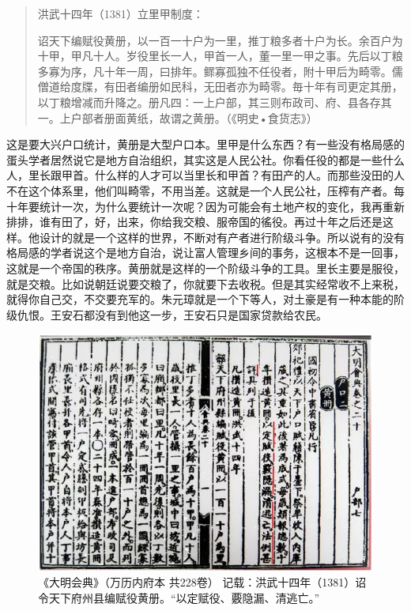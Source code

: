 \begin{quote}
洪武十四年（1381）立里甲制度：

诏天下编赋役黄册，以一百一十户为一里，推丁粮多者十户为长。余百户为十甲，甲凡十人。岁役里长一人，甲首一人，董一里一甲之事。先后以丁粮多寡为序，凡十年一周，曰排年。鳏寡孤独不任役者，附十甲后为畸零。儒僧道给度牒，有田者编册如民科，无田者亦为畸零。毎十年有司更定其册，以丁粮增减而升降之。册凡四：一上户部，其三则布政司、府、县各存其一。上户部者册面黄纸，故谓之黄册。（《明史•食货志》）
\end{quote}

这是要大兴户口统计，黄册是大型户口本。里甲是什么东西？有一些没有格局感的蛋头学者居然说它是地方自治组织，其实这是人民公社。你看任役的都是一些什么人，里长跟甲首。什么样的人才可以当里长和甲首？有田产的人。而那些没田的人不在这个体系里，他们叫畸零，不用当差。这就是一个人民公社，压榨有产者。每十年要统计一次，为什么要统计一次呢？因为可能会有土地产权的变化，我再重新排排，谁有田了，好，出来，你给我交粮、服帝国的徭役。再过十年之后还是这样。他设计的就是一个这样的世界，不断对有产者进行阶级斗争。所以说有的没有格局感的学者说这个是地方自治，说让富人管理乡间的事务，这根本不是一回事，这就是一个帝国的秩序。黄册就是这样的一个阶级斗争的工具。里长主要是服役，就是交粮。比如说朝廷说要交粮了，你就要下去收税。但是其实经常收不上来税，就得你自己交，不交要充军的。朱元璋就是一个下等人，对土豪是有一种本能的阶级仇恨。王安石都没有到他这一步，王安石只是国家贷款给农民。

\begin{figure}
	\centering
	\includegraphics[width=\textwidth]{images/image-46}
	\caption{《大明会典》（万历内府本 共228卷） 记载：洪武十四年（1381）诏令天下府州县编赋役黄册。“以定赋役、覈隐漏、清逃亡。”}
\end{figure}


